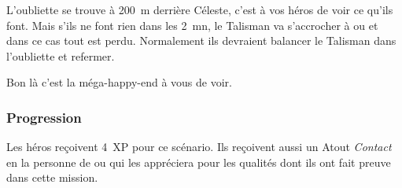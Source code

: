 L’oubliette se trouve à 200~m derrière Céleste, c’est à vos héros de voir ce qu’ils font. Mais s’ils ne font rien dans les 2~mn, le Talisman va s’accrocher à  ou  et dans ce cas tout est perdu. Normalement ils devraient balancer le Talisman dans l’oubliette et refermer.

Bon là c’est la méga-happy-end à vous de voir.

\subsubsection{Progression}
Les héros reçoivent 4~XP pour ce scénario. Ils reçoivent aussi un Atout \textit{Contact} en la personne de  ou  qui les appréciera pour les qualités dont ils ont fait preuve dans cette mission.

